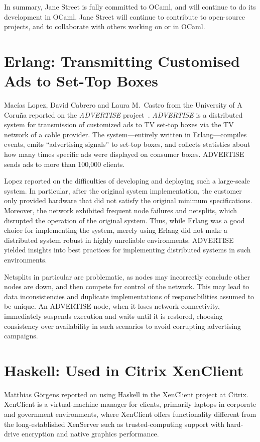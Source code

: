 \documentclass{jfp1}
\begin{document}
In summary, Jane Street is fully committed to OCaml, and will continue
to do its development in OCaml.  Jane Street will continue to
contribute to open-source projects, and to collaborate with others
working on or in OCaml.

\section{Erlang: Transmitting Customised Ads to Set-Top Boxes}

Macías Lopez, David Cabrero and Laura M.\ Castro from the University
of A Coruña reported on the \textit{ADVERTISE}
project~\cite{Lopez:2012:DDA:2370776.2370800,
  Lopez:2012:FTC:2364489.2364498}.  \textit{ADVERTISE} is a
distributed system for transmission of customized ads to TV set-top
boxes via the TV network of a cable provider.  The system---entirely
written in Erlang---compiles events, emits ``advertising signals'' to
set-top boxes, and collects statistics about how many times specific
ads were displayed on consumer boxes.  ADVERTISE sends ads to more
than 100,000 clients.

Lopez reported on the difficulties of developing and deploying such a
large-scale system.  In particular, after the original system
implementation, the customer only provided hardware that did not
satisfy the original minimum specifications.  Moreover, the network
exhibited frequent node failures and netsplits, which disrupted the
operation of the original system.  Thus, while Erlang was a good
choice for implementing the system, merely using Erlang did not make
a distributed system robust in highly unreliable environments.
ADVERTISE yielded insights into best practices for implementing
distributed systems in such environments.

Netsplits in particular are problematic, as nodes may incorrectly
conclude other nodes are down, and then compete for control of the
network.  This may lead to data inconsistencies and duplicate
implementations of responsibilities assumed to be unique. An ADVERTISE
node, when it loses network connectivity, immediately suspends
execution and waits until it is restored, choosing consistency over
availability in such scenarios to avoid corrupting advertising
campaigns.

\section{Haskell: Used in Citrix XenClient}

Matthias Görgens reported on using Haskell in the XenClient project at
Citrix. XenClient is a virtual-machine manager for clients, primarily
laptops in corporate and government environments, where XenClient
offers functionality different from the long-established XenServer
such as trusted-computing support with hard-drive encryption and
native graphics performance.
\end{document}
